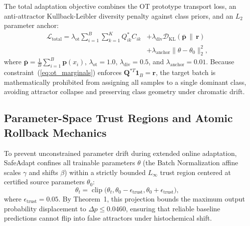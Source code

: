 \documentclass[journal]{IEEEtran}
\begin{document}
The total adaptation objective combines the OT prototype transport loss, an anti-attractor Kullback-Leibler diversity penalty against class priors, and an $L_2$ parameter anchor:
\begin{equation}
\label{eq:ot_total_loss}
\begin{aligned}
\mathcal{L}_{\text{total}} = \lambda_{\text{ot}} \sum_{i=1}^B \sum_{k=1}^K Q^*_{ik} C_{ik} &+ \lambda_{\text{div}} \mathcal{D}_{\mathrm{KL}}(\bar{\mathbf{p}} \,\|\, \mathbf{r}) \\
&+ \lambda_{\text{anchor}} \|\theta - \theta_0\|_2^2,
\end{aligned}
\end{equation}
where $\bar{\mathbf{p}} = \frac{1}{B} \sum_{i=1}^B \mathbf{p}(x_i)$, $\lambda_{\text{ot}} = 1.0$, $\lambda_{\text{div}} = 0.5$, and $\lambda_{\text{anchor}} = 0.01$. Because constraint~(\ref{eq:ot_marginals}) enforces $\mathbf{Q}^{*T} \mathbf{1}_B = \mathbf{r}$, the target batch is mathematically prohibited from assigning all samples to a single dominant class, avoiding attractor collapse and preserving class geometry under chromatic drift.

\subsection{Parameter-Space Trust Regions and Atomic Rollback Mechanics}
\label{sec:trust_region_mechanics}
To prevent unconstrained parameter drift during extended online adaptation, SafeAdapt confines all trainable parameters $\theta$ (the Batch Normalization affine scales $\gamma$ and shifts $\beta$) within a strictly bounded $L_\infty$ trust region centered at certified source parameters $\theta_0$:
\begin{equation}
\label{eq:trust_clip}
\theta_t = \operatorname{clip}\bigl(\theta_t, \theta_0 - \epsilon_{\text{trust}}, \theta_0 + \epsilon_{\text{trust}}\bigr),
\end{equation}
where $\epsilon_{\text{trust}} = 0.05$. By Theorem~1, this projection bounds the maximum output probability displacement to $\Delta p \le 0.0460$, ensuring that reliable baseline predictions cannot flip into false attractors under histochemical shift.
\end{document}
